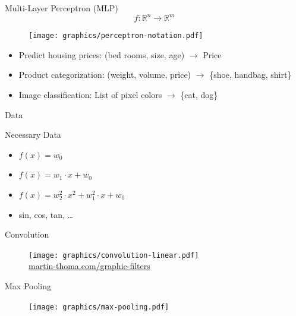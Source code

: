 \documentclass{beamer}
\begin{document}
\begin{frame}{Multi-Layer Perceptron (MLP)}
    $$f: \mathbb{R}^n \rightarrow \mathbb{R}^m$$
    \begin{figure}[ht]
        \centering
        \texttt{[image: graphics/perceptron-notation.pdf]}
    \end{figure}
\end{frame}

\begin{frame}{}
    \begin{itemize}[<+->]
        \item Predict housing prices: (bed rooms, size, age) $\rightarrow$ Price
        \item Product categorization: (weight, volume, price) $\rightarrow$ \{shoe, handbag, shirt\}
        \item Image classification: List of pixel colors $\rightarrow$ \{cat, dog\}
    \end{itemize}
\end{frame}

\begin{frame}{}
    \begin{center}
    \Huge Data
    \end{center}
\end{frame}

\begin{frame}{Necessary Data}
    \begin{itemize}
        \item $f(x) = w_0$
        \item $f(x) = w_1 \cdot x + w_0$
        \item $f(x) = w_2^2 \cdot x^2 + w_1^2 \cdot x + w_0$
        \item sin, cos, tan, \dots
    \end{itemize}
\end{frame}

\begin{frame}{Convolution}
\begin{figure}[ht]
    \centering
    \texttt{[image: graphics/convolution-linear.pdf]}\\
    \href{https://martin-thoma.com/graphic-filters/}{martin-thoma.com/graphic-filters}
\end{figure}
\end{frame}

\begin{frame}{Max Pooling}
\begin{figure}[ht]
    \centering
    \texttt{[image: graphics/max-pooling.pdf]}
\end{figure}
\end{frame}
\end{document}

